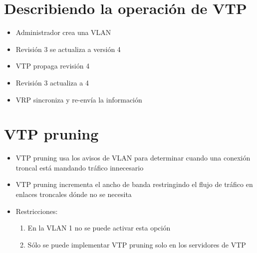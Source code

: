 \section{Describiendo la operación de VTP}
\begin{itemize}
    \item {Administrador crea una VLAN}
    \item {Revisión 3 se actualiza a versión 4}
    \item {VTP propaga revisión 4}
    \item {Revisión 3 actualiza a 4}
    \item {VRP sincroniza y re-envía la información}
\end{itemize}

\section{VTP pruning}

\begin{itemize}
    \item VTP pruning usa los avisos de VLAN para determinar cuando una conexión troncal está mandando tráfico innecesario 
    \item VTP pruning incrementa el ancho de banda restringindo el flujo de tráfico en enlaces troncales dónde no se necesita
    \item {Restricciones:
        \begin{enumerate}
            \item En la VLAN 1 no se puede activar esta opción 
            \item Sólo se puede implementar VTP pruning solo en los servidores de VTP
        \end{enumerate}}
\end{itemize}
